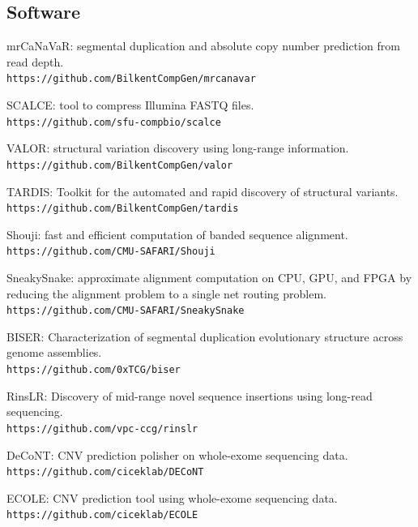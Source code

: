 \subsection{\small \sc Software}
\begin{list2}
\item
  mrCaNaVaR: segmental duplication and absolute copy number prediction from read depth.\\
  {\tt https://github.com/BilkentCompGen/mrcanavar}
  
\item
  SCALCE: tool to compress Illumina FASTQ files. \\
  {\tt https://github.com/sfu-compbio/scalce}
\item
  VALOR: structural variation discovery using long-range information. \\
  {\tt https://github.com/BilkentCompGen/valor}

\item
  TARDIS: Toolkit for the automated and rapid discovery of structural variants.\\
  {\tt https://github.com/BilkentCompGen/tardis}


\item
  Shouji: fast and efficient computation of banded sequence alignment.\\
  {\tt https://github.com/CMU-SAFARI/Shouji}
\item
  SneakySnake: approximate alignment computation on CPU, GPU, and FPGA by reducing the alignment problem to a single net routing problem.\\
  {\tt https://github.com/CMU-SAFARI/SneakySnake}
  \item
  BISER: Characterization of segmental duplication evolutionary structure across genome assemblies.\\
  {\tt https://github.com/0xTCG/biser}
  \item
  RinsLR: Discovery of mid-range novel sequence insertions using long-read sequencing.\\
  {\tt https://github.com/vpc-ccg/rinslr}
  \item
DeCoNT: CNV prediction polisher on whole-exome sequencing data.\\
{\tt https://github.com/ciceklab/DECoNT}
  \item
ECOLE: CNV prediction tool using whole-exome sequencing data.\\
{\tt https://github.com/ciceklab/ECOLE}


\end{list2}
